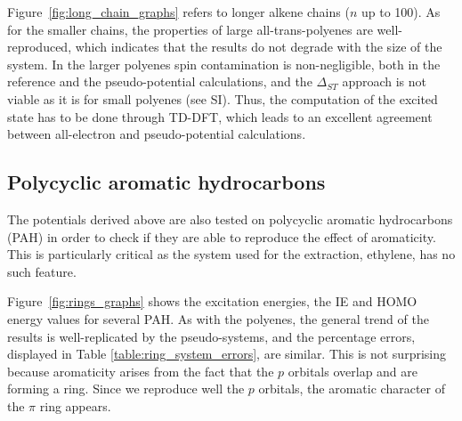 \documentclass[12pt]{article}
\begin{document}
Figure~\ref{fig:long_chain_graphs} refers to longer alkene chains (\(n\) up to 100).
As for the smaller chains, the properties of large all-trans-polyenes are well-reproduced,
which indicates that the results do not degrade with the size of the system.
In the larger polyenes spin contamination is non-negligible, both in the reference and the pseudo-potential calculations, and the $\Delta_{ST}$ approach is not viable as it is for small polyenes (see SI).
Thus, the computation of the excited state has to be done through TD-DFT, which leads to an excellent agreement between all-electron and pseudo-potential calculations.

\subsection*{\sffamily \large Polycyclic aromatic hydrocarbons}

The potentials derived above are also tested on polycyclic aromatic hydrocarbons (PAH)
in order to check if they are able to reproduce the effect of aromaticity.
This is particularly critical as the system used for the extraction, ethylene, has no such feature.

Figure~\ref{fig:rings_graphs} shows the excitation energies, the IE and
HOMO energy values for several PAH.
As with the polyenes, the general trend of the results is well-replicated
by the pseudo-systems, and the percentage errors, displayed in Table
\ref{table:ring_system_errors}, are similar.
This is not surprising because aromaticity arises from the fact that
the $p$ orbitals overlap and are forming a ring.
Since we reproduce well the $p$ orbitals, the aromatic character of the $\pi$ ring
appears.
\end{document}
